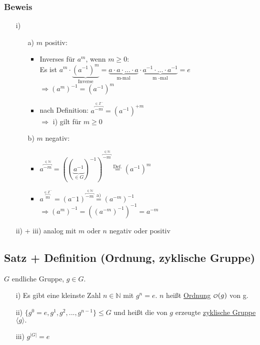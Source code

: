 \documentclass[12pt,titlepage, pdf]{article}
\newcommand\smallO{
	\mathchoice
	{{\scriptstyle\mathcal{O}}}
	{{\scriptstyle\mathcal{O}}}
	{{\scriptscriptstyle\mathcal{O}}}
	{\scalebox{.7}{$\scriptscriptstyle\mathcal{O}$}}
}
\newcommand{\uline}[1]{\underline{#1}}
\renewcommand{\>}{\rightarrow}
\renewcommand{\*}{\cdot}
\begin{document}
\subsubsection*{Beweis}
\begin{itemize}
	\item[i)] 
	\begin{itemize}
		\item[a)] $m$ positiv:
		\begin{itemize}
			\item Inverses für $a^m$, wenn $m \geq 0:$ \\
			Es ist $a^m  \cdot \underbrace{(a^{-1})^m}_{\text{Inverse}} = \underbrace{a \cdot a \cdot ... \cdot a}_{\text{m-mal}} \cdot \underbrace{ a^{-1} \cdot ... \cdot a^{-1}}_{\text{m -mal}} = e$ \\
			$\Rightarrow (a^m)^{-1}= (a^{-1})^m$
			\item nach Definition: $a^{\overbracket{-m}^{\in \mathbb{Z^-}}} = (a^{-1})^{+m}$ \\
			$\Rightarrow$ i) gilt für $m \geq 0$
		\end{itemize}
		\item[b)] $m$ negativ:
		\begin{itemize}
			\item $a^{\overbracket{-m}^{ \in \mathbb{N}}} = ((\underbrace{a^{-1}}_{\in G})^{-1})^{\overbracket{-m}^{ \in \mathbb{N}}} \overset{\textrm{Def.}}{=} (a^{-1})^m$
			\item $a^{\overbracket{m}^{ \in \mathbb{Z}^-}} = (a^-1)^{\overbracket{-m}^{ \in \mathbb{N}}} \overset{\textrm{a)}}{=} (a^{-m})^{-1}$\\$ \Rightarrow (a^m)^{-1} = ((a^{-m})^{-1})^{-1} = a^{-m}$
		\end{itemize}	
	\end{itemize}
	\item[ii) + iii)] analog mit $m$ oder $n$ negativ oder positiv 
\end{itemize}
\subsection{Satz + Definition (Ordnung, zyklische Gruppe)}
$G$ endliche Gruppe, $g \in G$. 
\begin{itemize}
	\item[i)] Es gibt eine kleinste Zahl $n \in \mathbb{N}$ mit $g^n = e$.
	$n$ heißt \uline{Ordnung} $\smallO(g)$ von g.
	\item[ii)] $\{g^0 = e, g^1, g^2,...,g^{n-1}\} \leq G$ und heißt die von $g$ erzeugte \uline{zyklische Gruppe} $\langle g \rangle.$
	\item[iii)] $g^{|G|} = e$
\end{itemize}
\end{document}
